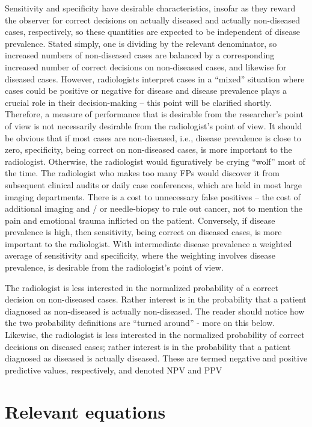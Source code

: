 \documentclass[
]{book}
\begin{document}
Sensitivity and specificity have desirable characteristics, insofar as they reward the observer for correct decisions on actually diseased and actually non-diseased cases, respectively, so these quantities are expected to be independent of disease prevalence. Stated simply, one is dividing by the relevant denominator, so increased numbers of non-diseased cases are balanced by a corresponding increased number of correct decisions on non-diseased cases, and likewise for diseased cases. However, radiologists interpret cases in a ``mixed'' situation where cases could be positive or negative for disease and disease prevalence plays a crucial role in their decision-making -- this point will be clarified shortly. Therefore, a measure of performance that is desirable from the researcher's point of view is not necessarily desirable from the radiologist's point of view. It should be obvious that if most cases are non-diseased, i.e., disease prevalence is close to zero, specificity, being correct on non-diseased cases, is more important to the radiologist. Otherwise, the radiologist would figuratively be crying ``wolf'' most of the time. The radiologist who makes too many FPs would discover it from subsequent clinical audits or daily case conferences, which are held in most large imaging departments. There is a cost to unnecessary false positives -- the cost of additional imaging and / or needle-biopsy to rule out cancer, not to mention the pain and emotional trauma inflicted on the patient. Conversely, if disease prevalence is high, then sensitivity, being correct on diseased cases, is more important to the radiologist. With intermediate disease prevalence a weighted average of sensitivity and specificity, where the weighting involves disease prevalence, is desirable from the radiologist's point of view.

The radiologist is less interested in the normalized probability of a correct decision on non-diseased cases. Rather interest is in the probability that a patient diagnosed as non-diseased is actually non-diseased. The reader should notice how the two probability definitions are ``turned around'' - more on this below. Likewise, the radiologist is less interested in the normalized probability of correct decisions on diseased cases; rather interest is in the probability that a patient diagnosed as diseased is actually diseased. These are termed negative and positive predictive values, respectively, and denoted NPV and PPV

\hypertarget{relevant-equations}{%
\section{Relevant equations}\label{relevant-equations}}
\end{document}

